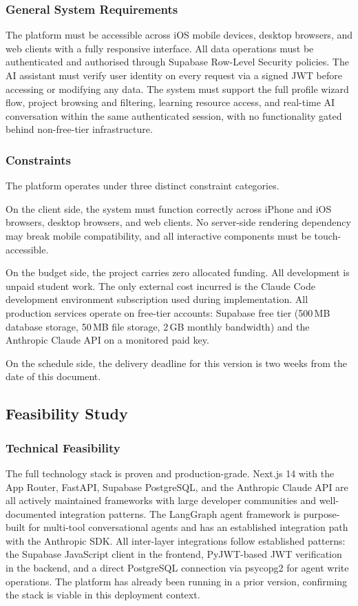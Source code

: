 \documentclass[12pt,a4paper]{article}
\begin{document}
\subsubsection{General System Requirements}

The platform must be accessible across iOS mobile devices, desktop browsers, and web
clients with a fully responsive interface. All data operations must be authenticated and
authorised through Supabase Row-Level Security policies. The AI assistant must verify
user identity on every request via a signed JWT before accessing or modifying any data.
The system must support the full profile wizard flow, project browsing and filtering,
learning resource access, and real-time AI conversation within the same authenticated
session, with no functionality gated behind non-free-tier infrastructure.

\subsubsection{Constraints}

The platform operates under three distinct constraint categories.

On the client side, the system must function correctly across iPhone and iOS browsers,
desktop browsers, and web clients. No server-side rendering dependency may break mobile
compatibility, and all interactive components must be touch-accessible.

On the budget side, the project carries zero allocated funding. All development is unpaid
student work. The only external cost incurred is the Claude Code development environment
subscription used during implementation. All production services operate on free-tier
accounts: Supabase free tier (500\,MB database storage, 50\,MB file storage,
2\,GB monthly bandwidth) and the Anthropic Claude API on a monitored paid key.

On the schedule side, the delivery deadline for this version is two weeks from the date
of this document.

\subsection{Feasibility Study}

\subsubsection{Technical Feasibility}

The full technology stack is proven and production-grade. Next.js 14 with the App Router,
FastAPI, Supabase PostgreSQL, and the Anthropic Claude API are all actively maintained
frameworks with large developer communities and well-documented integration patterns. The
LangGraph agent framework is purpose-built for multi-tool conversational agents and has
an established integration path with the Anthropic SDK. All inter-layer integrations
follow established patterns: the Supabase JavaScript client in the frontend, PyJWT-based
JWT verification in the backend, and a direct PostgreSQL connection via psycopg2 for
agent write operations. The platform has already been running in a prior version,
confirming the stack is viable in this deployment context.
\end{document}
